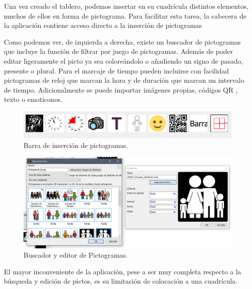 Una vez creado el tablero, podemos insertar en su cuadrícula distintos elementos, muchos de ellos en forma de pictograma. Para facilitar esta tarea, la cabecera de la aplicación contiene acceso directo a la inserción de pictogramas



Como podemos ver, de izquierda a derecha, existe un buscador de pictogramas que incluye la función de filtrar por juego de pictogramas. Además de poder editar ligeramente el picto ya sea coloreándolo o añadiendo un signo de pasado, presente o plural. Para el marcaje de tiempo pueden incluirse con facilidad pictogramas de reloj que marcan la hora y de duración que marcan un intervalo de tiempo. Adicionalmente se puede importar imágenes propias, códigos QR , texto o emoticonos.

\begin{figure}[h!]
	\centering
	\includegraphics[width=0.7\linewidth]{Imagenes/Bitmap/Ribbon Pictoselector}
	\caption{Barra de inserción de pictogramas.}
	\label{fig:ribbon-pictoselector}
\end{figure}

\begin{figure}[h!]
	\centering
	\includegraphics[width=0.7\linewidth]{Imagenes/Bitmap/Editor y buscador de pictoselector}
	\caption{Buscador y editor de Pictogramas.}
	\label{fig:editor-y-buscador-de-pictoselector}
\end{figure}




El mayor inconveniente de la aplicación, pese a ser muy completa respecto a la búsqueda y edición de pictos, es su limitación de colocación a una cuadrícula.

